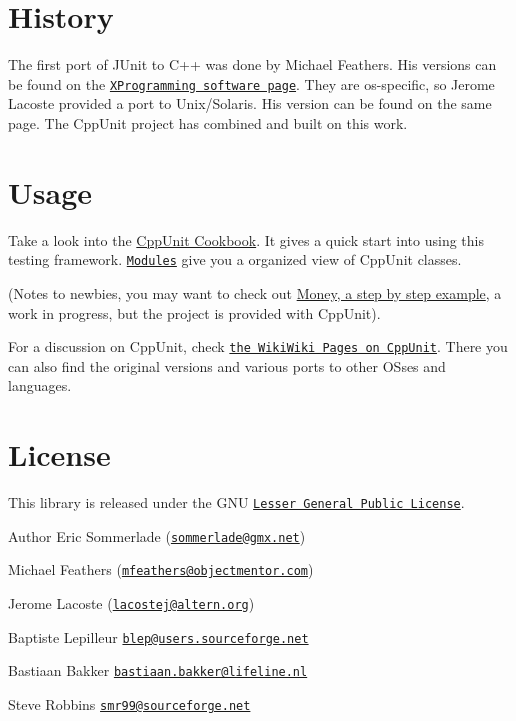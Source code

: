 \hypertarget{index__history}{}\section{History}\label{index__history}
The first port of J\+Unit to C++ was done by Michael Feathers. His versions can be found on the \href{http://www.xprogramming.com/software.htm}{\tt X\+Programming software page}. They are os-\/specific, so Jerome Lacoste provided a port to Unix/\+Solaris. His version can be found on the same page. The Cpp\+Unit project has combined and built on this work.\hypertarget{index__usage}{}\section{Usage}\label{index__usage}
Take a look into the \hyperlink{cppunit_cookbook}{Cpp\+Unit Cookbook}. It gives a quick start into using this testing framework. \href{modules.html}{\tt Modules} give you a organized view of Cpp\+Unit classes.

(Notes to newbies, you may want to check out \hyperlink{money_example}{Money, a step by step example}, a work in progress, but the project is provided with Cpp\+Unit).

For a discussion on Cpp\+Unit, check \href{http://c2.com/cgi/wiki?CppUnit}{\tt the Wiki\+Wiki Pages on Cpp\+Unit}. There you can also find the original versions and various ports to other O\+Sses and languages.\hypertarget{index__license}{}\section{License}\label{index__license}
This library is released under the G\+N\+U \href{http://www.gnu.org/copyleft/lesser.html}{\tt Lesser General Public License}.

\begin{DoxyAuthor}{Author}
Eric Sommerlade (\href{mailto:sommerlade@gmx.net}{\tt sommerlade@gmx.\+net}) 

Michael Feathers (\href{mailto:mfeathers@objectmentor.com}{\tt mfeathers@objectmentor.\+com}) 

Jerome Lacoste (\href{mailto:lacostej@altern.org}{\tt lacostej@altern.\+org}) 

Baptiste Lepilleur \href{mailto:blep@users.sourceforge.net}{\tt blep@users.\+sourceforge.\+net} 

Bastiaan Bakker \href{mailto:bastiaan.bakker@lifeline.nl}{\tt bastiaan.\+bakker@lifeline.\+nl} 

Steve Robbins \href{mailto:smr99@sourceforge.net}{\tt smr99@sourceforge.\+net} 
\end{DoxyAuthor}

